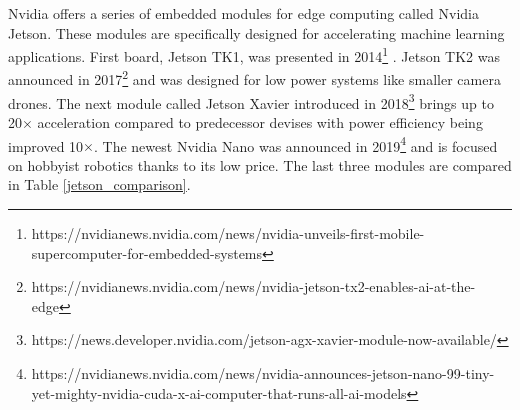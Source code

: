 \documentclass[twoside]{ctuthesis}
\theoremstyle{plain}
\theoremstyle{definition}
\theoremstyle{note}
\begin{document}
Nvidia offers a series of embedded modules for edge computing called Nvidia Jetson. These modules are specifically designed for accelerating machine learning applications. First board, Jetson TK1, was presented in 2014\footnote{https://nvidianews.nvidia.com/news/nvidia-unveils-first-mobile-supercomputer-for-embedded-systems}
. Jetson TK2 was announced in 2017\footnote{https://nvidianews.nvidia.com/news/nvidia-jetson-tx2-enables-ai-at-the-edge}
 and was designed for low power systems like smaller camera drones. The next module called Jetson Xavier introduced in 2018\footnote{https://news.developer.nvidia.com/jetson-agx-xavier-module-now-available/}
  brings up to 20$\times$ acceleration compared to predecessor devises with power efficiency being improved 10$\times$. The newest Nvidia Nano was announced in 2019\footnote{https://nvidianews.nvidia.com/news/nvidia-announces-jetson-nano-99-tiny-yet-mighty-nvidia-cuda-x-ai-computer-that-runs-all-ai-models}
   and is focused on hobbyist robotics thanks to its low price. The last three modules are compared in Table \ref{jetson_comparison}.
   
\end{document}

